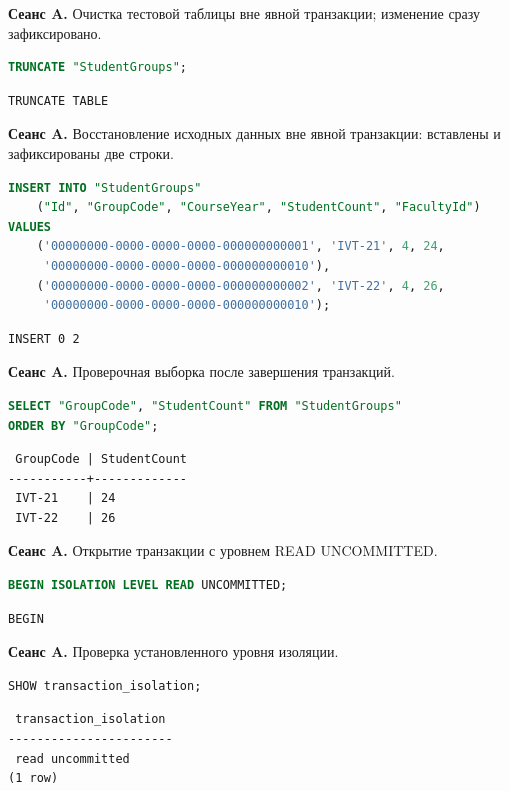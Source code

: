 \documentclass[12pt,a4paper]{article}
\begin{document}
\textbf{Сеанс A.} Очистка тестовой таблицы вне явной транзакции; изменение сразу зафиксировано.
\begin{lstlisting}[language=SQL]
TRUNCATE "StudentGroups";
\end{lstlisting}

\begin{lstlisting}
TRUNCATE TABLE
\end{lstlisting}

\textbf{Сеанс A.} Восстановление исходных данных вне явной транзакции: вставлены и зафиксированы две строки.
\begin{lstlisting}[language=SQL]
INSERT INTO "StudentGroups"
    ("Id", "GroupCode", "CourseYear", "StudentCount", "FacultyId")
VALUES
    ('00000000-0000-0000-0000-000000000001', 'IVT-21', 4, 24,
     '00000000-0000-0000-0000-000000000010'),
    ('00000000-0000-0000-0000-000000000002', 'IVT-22', 4, 26,
     '00000000-0000-0000-0000-000000000010');
\end{lstlisting}

\begin{lstlisting}
INSERT 0 2
\end{lstlisting}

\textbf{Сеанс A.} Проверочная выборка после завершения транзакций.
\begin{lstlisting}[language=SQL]
SELECT "GroupCode", "StudentCount" FROM "StudentGroups"
ORDER BY "GroupCode";
\end{lstlisting}

\begin{lstlisting}
 GroupCode | StudentCount
-----------+-------------
 IVT-21    | 24
 IVT-22    | 26
\end{lstlisting}

\textbf{Сеанс A.} Открытие транзакции с уровнем READ UNCOMMITTED.
\begin{lstlisting}[language=SQL]
BEGIN ISOLATION LEVEL READ UNCOMMITTED;
\end{lstlisting}

\begin{lstlisting}
BEGIN
\end{lstlisting}

\textbf{Сеанс A.} Проверка установленного уровня изоляции.
\begin{lstlisting}[language=SQL]
SHOW transaction_isolation;
\end{lstlisting}

\begin{lstlisting}
 transaction_isolation
-----------------------
 read uncommitted
(1 row)
\end{lstlisting}
\end{document}
